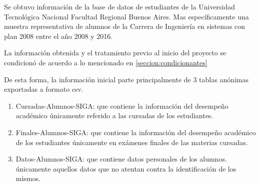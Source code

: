 

Se obtuvo información de la base  de datos de estudiantes de la Universidad Tecnológica Nacional Facultad Regional Buenos Aires. Mas específicamente una muestra representativa de alumnos de la Carrera de Ingeniería en sistemas con plan 2008 entre el año 2008 y 2016.

La información obtenida y el tratamiento previo al inicio del proyecto se condicionó de acuerdo a lo mencionado en \ref{seccion:condicionantes}

\label{datos:raw}
De esta forma, la información inicial parte principalmente de 3 tablas anónimas exportadas a formato csv.

\begin{enumerate}
\item Cursadas-Alumnos-SIGA: que contiene la información del desempeño académico únicamente referido a las cursadas de los estudiantes.
\item Finales-Alumnos-SIGA: que contiene la información del desempeño académico de los estudiantes únicamente en exámenes finales de las materias cursadas.
\item Datos-Alumnos-SIGA: que contiene datos personales de los alumnos. únicamente aquellos datos que no atentan contra la identificación de los mismos.
\end{enumerate}


